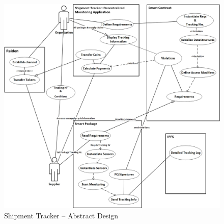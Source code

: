 \begin{figure}[h]
	\centering
    \includegraphics[width=170mm,scale=1]{figs/Abstractdesign}
	\caption{Shipment Tracker – Abstract Design}
	\label{fig:Abstractdesign}
\end{figure}
\clearpage




